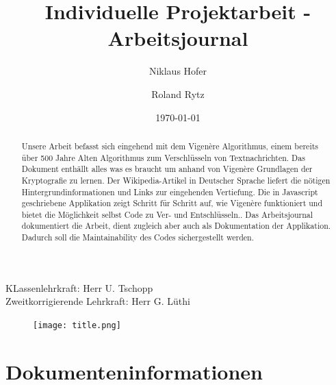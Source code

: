 \documentclass[11pt,paper=a4,final]{scrartcl}
\title{Individuelle Projektarbeit - Arbeitsjournal}
\author{Niklaus Hofer \and Roland Rytz}
\date{\today{}}
\begin{document}
\maketitle
KLassenlehrkraft: Herr U. Tschopp\\
Zweitkorrigierende Lehrkraft: Herr G. L\"uthi
\begin{figure}[h!]
  \centering
\texttt{[image: title.png]}
\end{figure}

\newpage
\begin{abstract}
  Unsere Arbeit befasst sich eingehend mit dem Vigen\`ere Algorithmus, einem
  bereits \"uber 500 Jahre Alten Algorithmus zum Verschl\"usseln von
  Textnachrichten. Das Dokument enth\"allt alles was es braucht um anhand von
  Vigen\`ere Grundlagen der Kryptografie zu lernen. Der Wikipedia-Artikel in
  Deutscher Sprache liefert die n\"otigen Hintergrundinformationen und Links zur
  eingehenden Vertiefung. Die in Javascript geschriebene Applikation zeigt Schritt
  f\"ur Schritt auf, wie Vigen\`ere funktioniert und bietet die M\"oglichkeit
  selbst Code zu Ver- und Entschl\"usseln.. Das Arbeitsjournal dokumentiert
  die Arbeit, dient zugleich aber auch als Dokumentation der Applikation. Dadurch
  soll die Maintainability des Codes sichergestellt werden.
\end{abstract}
\section{Dokumenteninformationen}
\end{document}
